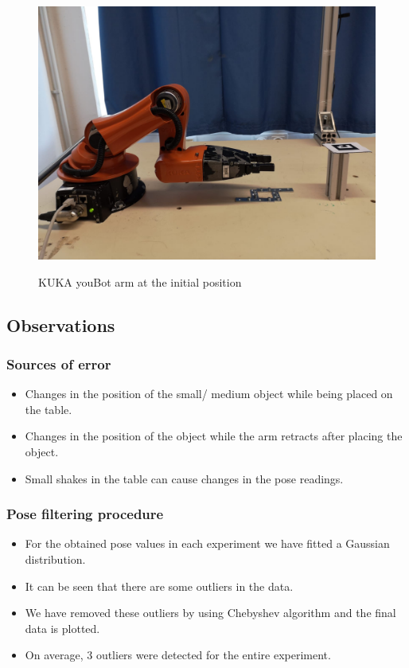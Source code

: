 \documentclass[11pt,a4paper]{article}
\begin{document}
				\begin{figure}[H]
					\centering
					\includegraphics[scale=0.2]{youbot_2}
					\label{Youbot}
					\caption{KUKA youBot arm at the initial position}
				\end{figure}
				\subsection{Observations}
				\subsubsection{Sources of error}
				\begin{itemize}
				\item Changes in the position of the small/ medium object while being placed on the table.
				\item Changes in the position of the object while the arm retracts after placing the object.
				\item Small shakes in the table can cause changes in the pose readings.
				\end{itemize}
				\subsubsection{Pose filtering procedure}
				\begin{itemize}
				\item For the obtained pose values in each experiment we have fitted a Gaussian distribution.
				\item It can be seen that there are some outliers in the data.
				\item We have removed these outliers by using Chebyshev algorithm and the final data is plotted.
				\item On average, 3 outliers were detected for the entire experiment.
				\end{itemize}
\end{document}
